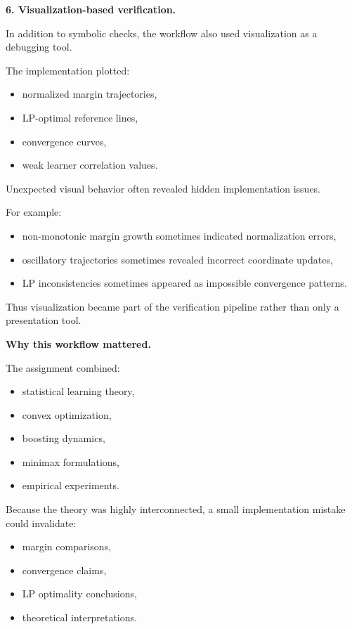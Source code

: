 \documentclass[11pt]{article}
\begin{document}
\begin{enumerate}
\begin{solutionbox}
\medskip

\textbf{6. Visualization-based verification.}

In addition to symbolic checks, the workflow also used visualization as a debugging tool.

The implementation plotted:
\begin{itemize}
    \item normalized margin trajectories,
    \item LP-optimal reference lines,
    \item convergence curves,
    \item weak learner correlation values.
\end{itemize}

Unexpected visual behavior often revealed hidden implementation issues.

For example:
\begin{itemize}
    \item non-monotonic margin growth sometimes indicated normalization errors,
    \item oscillatory trajectories sometimes revealed incorrect coordinate updates,
    \item LP inconsistencies sometimes appeared as impossible convergence patterns.
\end{itemize}

Thus visualization became part of the verification pipeline rather than only a presentation tool.

\medskip

\textbf{Why this workflow mattered.}

The assignment combined:
\begin{itemize}
    \item statistical learning theory,
    \item convex optimization,
    \item boosting dynamics,
    \item minimax formulations,
    \item empirical experiments.
\end{itemize}

Because the theory was highly interconnected, a small implementation mistake could invalidate:
\begin{itemize}
    \item margin comparisons,
    \item convergence claims,
    \item LP optimality conclusions,
    \item theoretical interpretations.
\end{itemize}


\end{solutionbox}
\end{enumerate}
\end{document}
